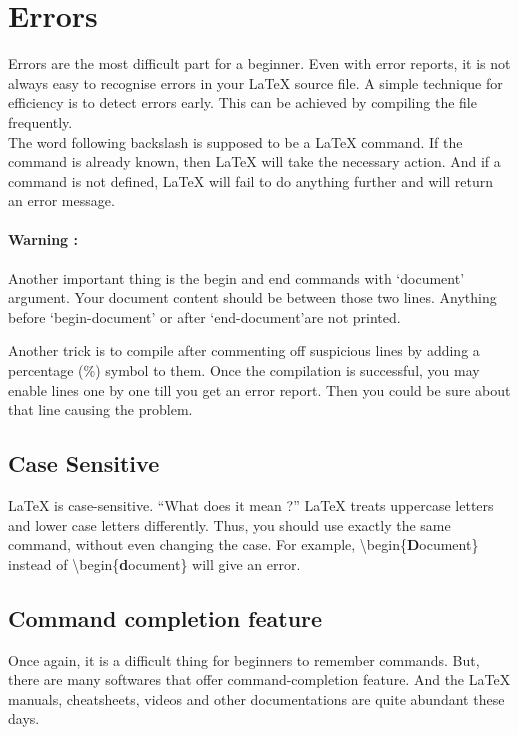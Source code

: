 \documentclass{article}
\begin{document}
\section{Errors}
Errors are the most difficult part for a beginner. Even with error reports, it is not always easy to recognise errors in your \LaTeX{} source file. A simple technique for efficiency is to detect errors early. This can be achieved by compiling the file frequently.\\

The word following backslash is supposed to be a LaTeX command. If the command is already known, then LaTeX will take the necessary action. And if a command is not defined, \LaTeX{} will fail to do anything further and will return an error message.\\

\paragraph{Warning :}
Another important thing is the begin and end commands with `document' argument. Your document content should be between those two lines. Anything before `begin-document' or after `end-document'are not printed.

Another trick is to compile after commenting off suspicious lines by adding a percentage (\%) symbol to them. Once the compilation is successful, you may enable lines one by one till you get an error report. Then you could be sure about that line causing the problem.

\subsection*{Case Sensitive}
\LaTeX{} is case-sensitive. ``What does it mean ?'' \LaTeX{} treats uppercase letters and lower case letters differently. Thus, you should use exactly the same command, without even changing the case. For example, \textbackslash begin\{\textbf{D}ocument\} instead of \textbackslash begin\{\textbf{d}ocument\} will give an error.

\subsection*{Command completion feature}
Once again, it is a difficult thing for beginners to remember commands. But, there are many softwares that offer command-completion feature. And the \LaTeX{} manuals, cheatsheets, videos and other documentations are quite abundant these days.
\end{document}
